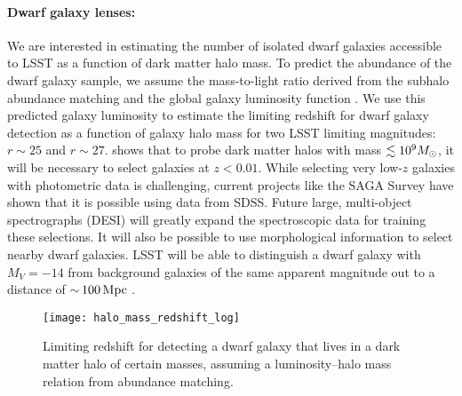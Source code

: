\paragraph{Dwarf galaxy lenses:}
We are interested in estimating the number of isolated dwarf galaxies accessible to LSST as a function of dark matter halo mass.
To predict the abundance of the dwarf  galaxy sample, we assume the mass-to-light ratio derived from the subhalo abundance matching and the global galaxy luminosity function \citep{2015MNRAS.451.1540L}.
We use this predicted galaxy luminosity to estimate the limiting redshift for dwarf galaxy detection as a function of galaxy halo mass for two LSST limiting magnitudes: $r \sim 25$ and $r \sim 27$. 
 shows that to probe dark matter halos with mass $\lesssim 10^9 M_\odot$, it will be necessary to select galaxies at $z < 0.01$. 
While selecting very low-$z$ galaxies with photometric data is challenging, current projects like the SAGA Survey \citep{Geha:2017} have shown that it is possible using data from SDSS. 
Future large, multi-object spectrographs (\eg DESI) will greatly expand the spectroscopic data for training these selections. 
It will also be possible to use morphological information to select nearby dwarf galaxies.
LSST will be able to distinguish a dwarf galaxy with $M_V=-14$ from background galaxies of the same apparent magnitude out to a distance of $ {\sim}\, 100 \mathrm{\,Mpc}$ \citep[Section 9 of][]{0912.0201}.

\begin{figure}
\centering
\texttt{[image: halo\_mass\_redshift\_log]}
\caption{\label{fig:dwarf_redshift} Limiting redshift for detecting a dwarf galaxy that lives in a dark matter halo of certain masses, assuming a luminosity--halo mass relation from abundance matching.}
\end{figure}


